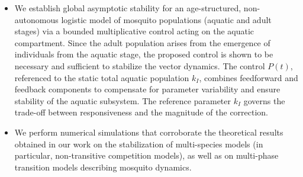 \documentclass[10pt, a4paper]{amsart}
\theoremstyle{plain}
\theoremstyle{definition}
\theoremstyle{remark}
\numberwithin{equation}{section}
\begin{document}
\begin{itemize}


\item We establish global asymptotic stability for an age-structured, non-autonomous logistic model of mosquito populations (aquatic and adult stages) via a bounded multiplicative control acting on the aquatic compartment. Since the adult population arises from the emergence of individuals from the aquatic stage, the proposed control is shown to be necessary and sufficient to stabilize the vector dynamics. The control $P(t)$, referenced to the static total aquatic population $k_I$, combines feedforward and feedback components to compensate for parameter variability and ensure stability of the aquatic subsystem. The reference parameter $k_I$ governs the trade-off between responsiveness and the magnitude of the correction.

\item We perform numerical simulations that corroborate the theoretical results obtained in our work on the stabilization of multi-species models (in particular, non-transitive competition models), as well as on multi-phase transition models describing mosquito dynamics.
\end{itemize}
\end{document}
